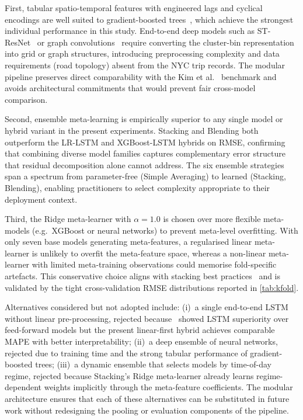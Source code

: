 First, tabular spatio-temporal features with engineered lags and cyclical encodings are well suited to gradient-boosted trees~\parencite{chen2016xgboost}, which achieve the strongest individual performance in this study. End-to-end deep models such as ST-ResNet~\parencite{zhang2017deep} or graph convolutions~\parencite{li2018diffusion} require converting the cluster-bin representation into grid or graph structures, introducing preprocessing complexity and data requirements (road topology) absent from the NYC trip records. The modular pipeline preserves direct comparability with the Kim et al.~\parencite{kim2020hybrid} benchmark and avoids architectural commitments that would prevent fair cross-model comparison.

Second, ensemble meta-learning is empirically superior to any single model or hybrid variant in the present experiments. Stacking and Blending both outperform the LR-LSTM and XGBoost-LSTM hybrids on RMSE, confirming that combining diverse model families captures complementary error structure that residual decomposition alone cannot address. The six ensemble strategies span a spectrum from parameter-free (Simple Averaging) to learned (Stacking, Blending), enabling practitioners to select complexity appropriate to their deployment context.

Third, the Ridge meta-learner with $\alpha{=}1.0$ is chosen over more flexible meta-models (e.g.\ XGBoost or neural networks) to prevent meta-level overfitting. With only seven base models generating meta-features, a regularised linear meta-learner is unlikely to overfit the meta-feature space, whereas a non-linear meta-learner with limited meta-training observations could memorise fold-specific artefacts. This conservative choice aligns with stacking best practices~\parencite{wolpert1992stacking} and is validated by the tight cross-validation RMSE distributions reported in \autoref{tab:kfold}.

Alternatives considered but not adopted include: (i)~a single end-to-end LSTM without linear pre-processing, rejected because~\parencite{xu2017realtime} showed LSTM superiority over feed-forward models but the present linear-first hybrid achieves comparable MAPE with better interpretability; (ii)~a deep ensemble of neural networks, rejected due to training time and the strong tabular performance of gradient-boosted trees; (iii)~a dynamic ensemble that selects models by time-of-day regime, rejected because Stacking's Ridge meta-learner already learns regime-dependent weights implicitly through the meta-feature coefficients. The modular architecture ensures that each of these alternatives can be substituted in future work without redesigning the pooling or evaluation components of the pipeline.
